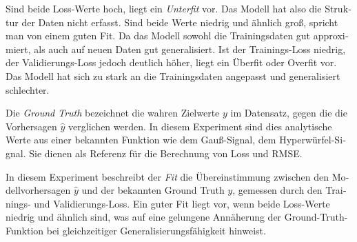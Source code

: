 \begin{otherlanguage}{ngerman}
Sind beide Loss-Werte hoch, liegt ein \textit{Unterfit} vor. Das Modell hat also die Struktur der Daten nicht erfasst. Sind beide Werte niedrig und ähnlich groß, spricht man von einem guten Fit. Da das Modell sowohl die Trainingsdaten gut approximiert, als auch auf neuen Daten gut generalisiert. Ist der Trainings-Loss niedrig, der Validierungs-Loss jedoch deutlich höher, liegt ein Überfit oder Overfit vor. Das Modell hat sich zu stark an die Trainingsdaten angepasst und generalisiert schlechter.

Die \textit{Ground Truth} bezeichnet die wahren Zielwerte $y$ im Datensatz, gegen die die Vorhersagen $\hat{y}$ verglichen werden. In diesem Experiment sind dies analytische Werte aus einer bekannten Funktion wie dem Gauß-Signal, dem Hyperwürfel-Signal. Sie dienen als Referenz für die Berechnung von Loss und RMSE.

In diesem Experiment beschreibt der \textit{Fit} die Übereinstimmung zwischen den Modellvorhersagen $\hat{y}$ und der bekannten Ground Truth $y$, gemessen durch den Trainings- und Validierungs-Loss. Ein guter Fit liegt vor, wenn beide Loss-Werte niedrig und ähnlich sind, was auf eine gelungene Annäherung der Ground-Truth-Funktion bei gleichzeitiger Generalisierungsfähigkeit hinweist.


\vspace{0.125\baselineskip}
\noindent


\end{otherlanguage}
